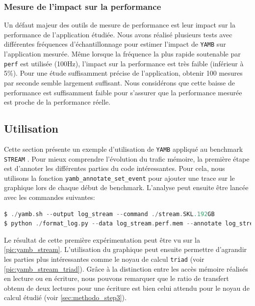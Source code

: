     \subsubsection{Mesure de l'impact sur la performance}
        Un défaut majeur des outils de mesure de performance est leur impact sur la performance de l'application étudiée. Nous avons réalisé plusieurs tests avec différentes fréquences d'échantillonnage pour estimer l'impact de \verb|YAMB| sur l'application mesurée. Même lorsque la fréquence la plus rapide soutenable par \verb=perf= est utilisée (100Hz), l'impact sur la performance est très faible (inférieur à 5\%). Pour une étude suffisamment précise de l'application, obtenir 100 mesures par seconde semble largement suffisant. Nous considérons que cette baisse de performance est suffisamment faible pour s'assurer que la performance mesurée est proche de la performance réelle.
     
    
    
    
\subsection{Utilisation}
 

        Cette section présente un exemple d'utilisation de \verb=YAMB= appliqué au benchmark \verb=STREAM= \cite{McCalpin1995}. Pour mieux comprendre l'évolution du trafic mémoire, la première étape est d'annoter les différentes parties du code intéressantes. Pour cela, nous utilisons la fonction \verb=yamb_annotate_set_event= pour ajouter une trace sur le graphique lors de chaque début de benchmark. L'analyse peut ensuite être lancée avec les commandes suivantes:
    
\begin{lstlisting}[label=lst:yamb_use ,language=C]
$ ./yamb.sh --output log_stream --command ./stream.SKL.192GB
$ python ./format_log.py --data log_stream.perf.mem --annotate log_stream.annotate
\end{lstlisting}

        Le résultat de cette première expérimentation peut être vu sur la \autoref{pic:yamb_stream}. L'utilisation du graphique peut ensuite permettre d'agrandir les parties plus intéressantes comme le noyau de calcul \verb=triad= (voir \autoref{pic:yamb_stream_triad}). Grâce à la distinction entre les accès mémoire réalisés en lecture ou en écriture, nous pouvons remarquer que le ratio de transfert obtenu de deux lectures pour une écriture est bien celui attendu pour le noyau de calcul étudié (voir \autoref{sec:methodo_step3}).
        
